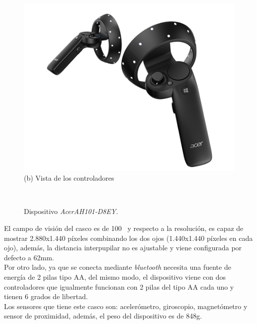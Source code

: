 \begin{figure}[H]
\begin{minipage}[t]{0.5\textwidth}
        \includegraphics[scale=0.42]{Images/Estado del arte/acerh101controller.png}\\
       (b) Vista de los controladores
    \end{minipage}\\
    \caption[Dispositivo \textit{AcerAH101-D8EY}]{Dispositivo \textit{AcerAH101-D8EY}\footnotemark.}
    \label{fig:acerAH101}
\end{figure}


El campo de visión del casco es de 100\degree~  y respecto a la resolución, es capaz de mostrar 2.880x1.440 píxeles combinando los dos ojos (1.440x1.440 píxeles en cada ojo), además, la distancia interpupilar no es ajustable y viene configurada por defecto a 62mm.\\



Por otro lado, ya que se conecta mediante \textit{bluetooth} necesita una fuente de energía de 2 pilas tipo AA, del mismo modo, el dispositivo viene con dos controladores que igualmente funcionan con 2 pilas del tipo AA cada uno y tienen 6 grados de libertad. \\

Los sensores que tiene este casco son: acelerómetro, giroscopio, magnetómetro y sensor de proximidad, además, el peso del dispositivo es de 848g. 